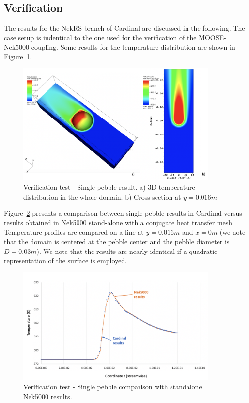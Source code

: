 \subsection{Verification}
\label{s:nrs1}

The results for the NekRS branch of Cardinal are discussed in the following. The case setup is indentical to the one used for the verification of the MOOSE-Nek5000 coupling. Some results for the temperature distribution are shown in Figure~\ref{f:nrs1}.

\begin{figure}[!h]
\centering
\includegraphics[clip=true,width=0.9\textwidth]{Figures/nrs_vv1}
\caption{Verification test - Single pebble result. a) 3D temperature distribution in the whole domain. b) Cross section at $y=0.016 m$.}
\label{f:nrs1}
\end{figure}

Figure~\ref{f:nrs2} presents a comparison between single pebble results in Cardinal versus results obtained in Nek5000 stand-alone with a conjugate heat transfer mesh. Temperature profiles are compared on a line at $y=0.016 m$ and $x=0 m$ (we note that the domain is centered at the pebble center and the pebble diameter is $D=0.03 m$). We note that the results are nearly identical if a quadratic representation of the surface is employed.

\begin{figure}[!h]
\centering
\includegraphics[clip=true,width=0.9\textwidth]{Figures/nrs_vv2}
\caption{Verification test - Single pebble comparison with standalone Nek5000 results. }
\label{f:nrs2}
\end{figure}

